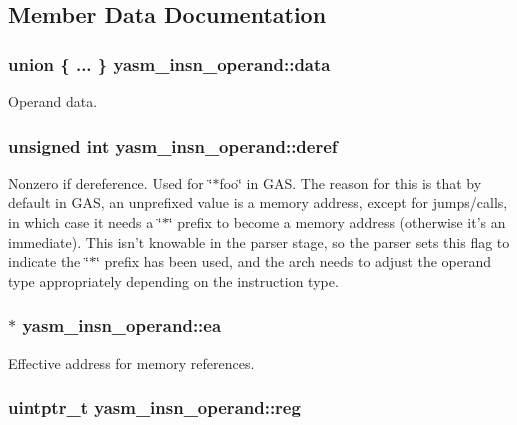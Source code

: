 \subsection{Member Data Documentation}
\hypertarget{structyasm__insn__operand_ac68778c6b44bd99608852f865a4586a9}{
\subsubsection[{data}]{\setlength{\rightskip}{0pt plus 5cm}union \{ ... \}   yasm\-\_\-insn\-\_\-operand\-::data}}\label{structyasm__insn__operand_ac68778c6b44bd99608852f865a4586a9}
Operand data. \hypertarget{structyasm__insn__operand_a817439e55bbb3e6c81a2ef08e96fc5cf}{
\subsubsection[{deref}]{\setlength{\rightskip}{0pt plus 5cm}unsigned int yasm\-\_\-insn\-\_\-operand\-::deref}}\label{structyasm__insn__operand_a817439e55bbb3e6c81a2ef08e96fc5cf}
Nonzero if dereference. Used for \char`\"{}$\ast$foo\char`\"{} in G\-A\-S. The reason for this is that by default in G\-A\-S, an unprefixed value is a memory address, except for jumps/calls, in which case it needs a \char`\"{}$\ast$\char`\"{} prefix to become a memory address (otherwise it's an immediate). This isn't knowable in the parser stage, so the parser sets this flag to indicate the \char`\"{}$\ast$\char`\"{} prefix has been used, and the arch needs to adjust the operand type appropriately depending on the instruction type. \hypertarget{structyasm__insn__operand_a5da6f0008883b0ff45c15cf2b62b8681}{
\subsubsection[{ea}]{$\ast$ yasm\-\_\-insn\-\_\-operand\-::ea}}\label{structyasm__insn__operand_a5da6f0008883b0ff45c15cf2b62b8681}
Effective address for memory references. \hypertarget{structyasm__insn__operand_a212cb5db883ebf1f1ecc5972ee7ba85b}{
\subsubsection[{reg}]{\setlength{\rightskip}{0pt plus 5cm}uintptr\-\_\-t yasm\-\_\-insn\-\_\-operand\-::reg}}\label{structyasm__insn__operand_a212cb5db883ebf1f1ecc5972ee7ba85b}
